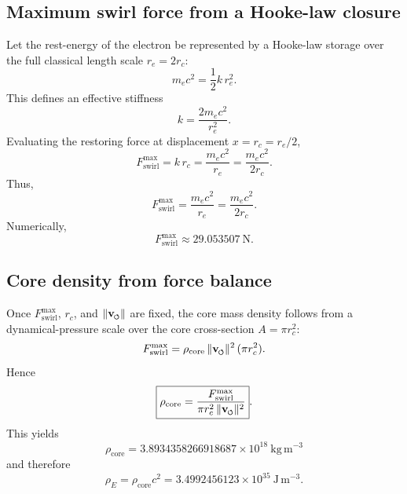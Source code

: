 \documentclass[11pt]{article}
\newcommand{\vswirl}{\mathbf{v}_{\mkern-2mu\scriptscriptstyle\boldsymbol{\circlearrowleft}}}
\newcommand{\rc}{r_c}                                    %
\begin{document}
    \subsection{Maximum swirl force from a Hooke-law closure}
    Let the rest-energy of the electron be represented by a Hooke-law storage over the full classical length scale \(r_e=2\rc\):
    \begin{equation}
        m_e c^2 = \frac{1}{2}k\,r_e^2.
        \label{eq:hooke-rest-energy}
    \end{equation}
    This defines an effective stiffness
    \begin{equation}
        k = \frac{2m_e c^2}{r_e^2}.
        \label{eq:k-effective}
    \end{equation}
    Evaluating the restoring force at displacement \(x=\rc=r_e/2\),
    \begin{equation}
        F_{\text{swirl}}^{\max} = k\,\rc
        = \frac{m_e c^2}{r_e}
        = \frac{m_e c^2}{2\rc}.
        \label{eq:Fswirlmax-from-hooke}
    \end{equation}
    Thus,
    \begin{equation}
        \boxed{
            F_{\text{swirl}}^{\max}=\frac{m_e c^2}{r_e}=\frac{m_e c^2}{2\rc}
        }.
    \end{equation}
    Numerically,
    \[
        \boxed{
            F_{\text{swirl}}^{\max}\approx 29.053507\ \mathrm{N}
        }.
    \]
    
    \subsection{Core density from force balance}
    Once \(F_{\text{swirl}}^{\max}\), \(\rc\), and \(\lVert\vswirl\rVert\) are fixed, the core mass density follows from a dynamical-pressure scale over the core cross-section \(A=\pi \rc^2\):
    \begin{equation}
        F_{\text{swirl}}^{\max} = \rho_{\text{core}}\,\lVert \vswirl\rVert^2\,(\pi \rc^2).
        \label{eq:F-dyn-pressure-core}
    \end{equation}
    Hence
    \begin{equation}
        \boxed{
            \rho_{\text{core}}=\frac{F_{\text{swirl}}^{\max}}{\pi \rc^2\,\lVert\vswirl\rVert^2}
        }.
        \label{eq:rho-core-derived}
    \end{equation}
    This yields
    \[
        \boxed{
            \rho_{\text{core}}=3.8934358266918687\times 10^{18}\ \mathrm{kg\,m^{-3}}
        }
    \]
    and therefore
    \begin{equation}
        \boxed{
            \rho_{\!E} = \rho_{\text{core}}c^2
            = 3.4992456123\times 10^{35}\ \mathrm{J\,m^{-3}}.
        }
        \label{eq:rhoE-core}
    \end{equation}
    
\end{document}
